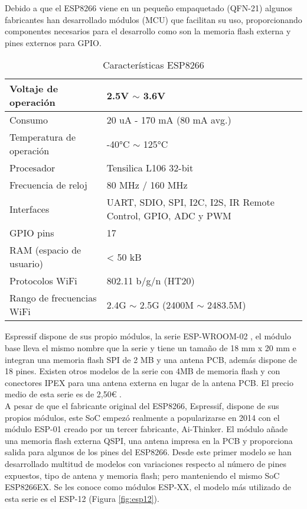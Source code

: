 \documentclass[../proyecto.tex]{subfiles}
\begin{document}
Debido a que el ESP8266 viene en un pequeño empaquetado (QFN-21) algunos fabricantes han desarrollado módulos (MCU) que facilitan su uso, proporcionando componentes necesarios para el desarrollo como son la memoria flash externa y pines externos para GPIO.\\

\begin{table}[H]
\centering
\begin{tabular}{ |l|m{20em}| }
\hline
Voltaje de operación      & 2.5V $\sim$ 3.6V          \\ \hline
Consumo                   & 20 uA - 170 mA (80 mA avg.)  \\ \hline
Temperatura de operación  & -40°C $\sim$ 125°C        \\ \hline
Procesador                & Tensilica L106 32-bit     \\ \hline
Frecuencia de reloj       & 80 MHz / 160 MHz          \\ \hline
Interfaces                & UART, SDIO, SPI, I2C, I2S, IR Remote Control, GPIO, ADC y PWM                           \\ \hline
GPIO pins                 & 17                        \\ \hline
RAM (espacio de usuario)  & < 50 kB                     \\ \hline
Protocolos WiFi           & 802.11 b/g/n (HT20)       \\ \hline
Rango de frecuencias WiFi & 2.4G $\sim$ 2.5G (2400M $\sim$ 2483.5M) \\ \hline
\end{tabular}
\caption{Características ESP8266}
\label{table:caracteristicas_esp8266}
\end{table}

Espressif dispone de sus propio módulos, la serie ESP-WROOM-02 \cite{espwroom02_overview}, el módulo base \cite{espwroom02_datasheet} lleva el mismo nombre que la serie y tiene un tamaño de 18 mm x 20 mm e integran una memoria flash SPI de 2 MB y una antena PCB, además dispone de 18 pines. Existen otros modelos de la serie con 4MB de memoria flash y con conectores IPEX para una antena externa en lugar de la antena PCB. El precio medio de esta serie es de 2,50€ \cite{espressif_provider_digikey} \cite{espressif_provider_mouser}.\\

A pesar de que el fabricante original del ESP8266, Espressif, dispone de sus propios módulos, este SoC empezó realmente a popularizarse en 2014 con el módulo ESP-01 creado por un tercer fabricante, Ai-Thinker. El módulo añade una memoria flash externa QSPI, una antena impresa en la PCB y proporciona salida para algunos de los pines del ESP8266. Desde este primer modelo se han desarrollado multitud de modelos con variaciones respecto al número de pines expuestos, tipo de antena y memoria flash; pero manteniendo el mismo SoC ESP8266EX. Se les conoce como módulos ESP-XX, el modelo más utilizado de esta serie es el ESP-12 (Figura \ref{fig:esp12}). \\
\end{document}
